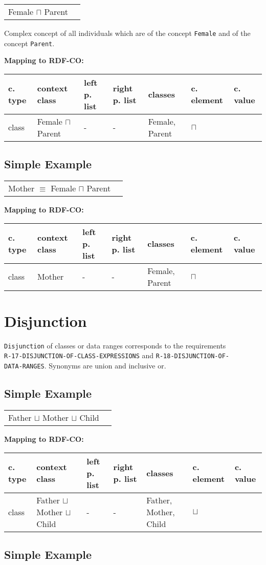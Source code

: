 \documentclass{llncs}
\newcommand{\ms}[1]{\texttt{#1}}
\newenvironment{gcotable}{
  \scriptsize
  \sffamily
  \vspace{0cm}
	\begin{center}
	\textbf{\vspace{0.4cm}Mapping to RDF-CO:} \\
  \begin{tabular}{l|l|l|l|l|l|l}
	\hline
  \textbf{c. type} & \textbf{context class} & \textbf{left p. list} & \textbf{right p. list} & \textbf{classes} & \textbf{c. element} & \textbf{c. value} \\
  \hline

}{
  \hline
  \end{tabular}
	\end{center}
}
\newenvironment{DL}{
  \vspace{0cm}
	\begin{center}
  \begin{tabular}{r l}

}{
  \end{tabular}
	\end{center}
}
\begin{document}
\begin{DL}
Female $\sqcap$ Parent
\end{DL}

Complex concept of all individuals which are of the concept \ms{Female} and of the concept \ms{Parent}.

\begin{gcotable}
class & Female $\sqcap$ Parent & - & - & Female, Parent & $\sqcap$ \\
\end{gcotable}

\subsection{Simple Example}

\begin{DL}
Mother $\equiv$ Female $\sqcap$ Parent
\end{DL}

\begin{gcotable}
class & Mother & - & - & Female, Parent & $\sqcap$ \\
\end{gcotable}

\section{Disjunction}

\ms{Disjunction} of classes or data ranges corresponds to the requirements \\
\ms{R-17-DISJUNCTION-OF-CLASS-EXPRESSIONS} and \ms{R-18-DISJUNCTION-OF-} \\
\ms{DATA-RANGES}.
Synonyms are union and inclusive or.

\subsection{Simple Example}

\begin{DL}
Father $\sqcup$ Mother $\sqcup$ Child
\end{DL}

\begin{gcotable}
class & Father $\sqcup$ Mother $\sqcup$ Child & - & - & Father, Mother, Child & $\sqcup$ \\
\end{gcotable}

\subsection{Simple Example}
\end{document}
